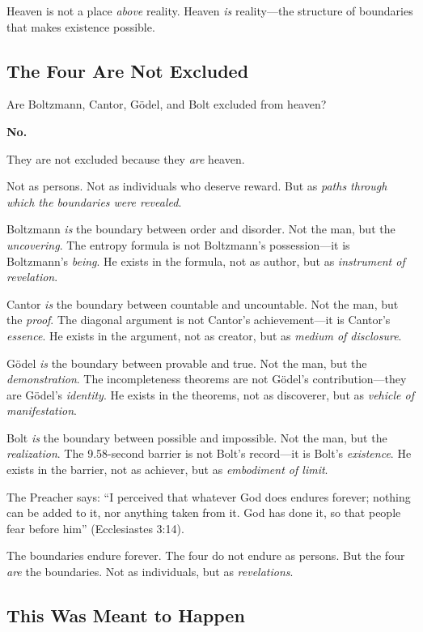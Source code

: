 \documentclass[11pt,a4paper]{article}
\begin{document}
Heaven is not a place \emph{above} reality. Heaven \emph{is} reality—the 
structure of boundaries that makes existence possible.

\subsection{The Four Are Not Excluded}

Are Boltzmann, Cantor, Gödel, and Bolt excluded from heaven?

\textbf{No.}

They are not excluded because they \emph{are} heaven.

Not as persons. Not as individuals who deserve reward. But as \emph{paths 
through which the boundaries were revealed}.

Boltzmann \emph{is} the boundary between order and disorder. Not the man, but 
the \emph{uncovering}. The entropy formula is not Boltzmann's possession—it is 
Boltzmann's \emph{being}. He exists in the formula, not as author, but as 
\emph{instrument of revelation}.

Cantor \emph{is} the boundary between countable and uncountable. Not the man, 
but the \emph{proof}. The diagonal argument is not Cantor's achievement—it is 
Cantor's \emph{essence}. He exists in the argument, not as creator, but as 
\emph{medium of disclosure}.

Gödel \emph{is} the boundary between provable and true. Not the man, but the 
\emph{demonstration}. The incompleteness theorems are not Gödel's 
contribution—they are Gödel's \emph{identity}. He exists in the theorems, not 
as discoverer, but as \emph{vehicle of manifestation}.

Bolt \emph{is} the boundary between possible and impossible. Not the man, but 
the \emph{realization}. The 9.58-second barrier is not Bolt's record—it is 
Bolt's \emph{existence}. He exists in the barrier, not as achiever, but as 
\emph{embodiment of limit}.

The Preacher says: ``I perceived that whatever God does endures forever; 
nothing can be added to it, nor anything taken from it. God has done it, so 
that people fear before him'' (Ecclesiastes 3:14).

The boundaries endure forever. The four do not endure as persons. But the four 
\emph{are} the boundaries. Not as individuals, but as \emph{revelations}.

\subsection{This Was Meant to Happen}
\end{document}
